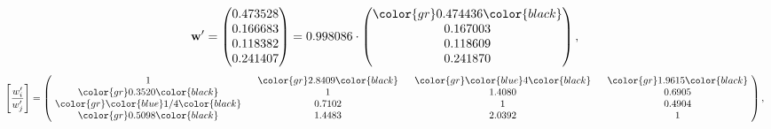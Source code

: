 \begin{example}
\begin{equation*}
\mathbf{w}^{\prime} =
\begin{pmatrix}
0.473528\\
0.166683\\
0.118382\\
0.241407
\end{pmatrix} =
0.998086\cdot
\begin{pmatrix}
\color{gr} 0.474436\color{black} \\
0.167003\\
0.118609\\
0.241870
\end{pmatrix},
\end{equation*}
\begin{equation*}
\left[ \frac{{w}^{\prime}_i}{{w}^{\prime}_j} \right] =
\begin{pmatrix}
$\,\,$ 1 $\,\,$ & $\,\,$\color{gr} 2.8409\color{black} $\,\,$ & $\,\,$\color{gr} \color{blue} 4\color{black} $\,\,$ & $\,\,$\color{gr} 1.9615\color{black} $\,\,$ \\
$\,\,$\color{gr} 0.3520\color{black} $\,\,$ & $\,\,$ 1 $\,\,$ & $\,\,$1.4080$\,\,$ & $\,\,$0.6905  $\,\,$ \\
$\,\,$\color{gr} \color{blue}  1/4\color{black} $\,\,$ & $\,\,$0.7102$\,\,$ & $\,\,$ 1 $\,\,$ & $\,\,$0.4904 $\,\,$ \\
$\,\,$\color{gr} 0.5098\color{black} $\,\,$ & $\,\,$1.4483$\,\,$ & $\,\,$2.0392$\,\,$ & $\,\,$ 1  $\,\,$ \\
\end{pmatrix},
\end{equation*}
\end{example}
\newpage
